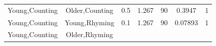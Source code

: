\documentclass[]{article}
\theoremstyle{definition}
\theoremstyle{definition}
\theoremstyle{definition}
\theoremstyle{remark}
\begin{document}
\begin{longtable}[]{@{}ccccccc@{}}
\begin{minipage}[t]{0.16\columnwidth}
Young,Counting\strut
\end{minipage} & \begin{minipage}[t]{0.16\columnwidth}\centering\strut
Older,Counting\strut
\end{minipage} & \begin{minipage}[t]{0.10\columnwidth}\centering\strut
0.5\strut
\end{minipage} & \begin{minipage}[t]{0.11\columnwidth}\centering\strut
1.267\strut
\end{minipage} & \begin{minipage}[t]{0.05\columnwidth}\centering\strut
90\strut
\end{minipage} & \begin{minipage}[t]{0.11\columnwidth}\centering\strut
0.3947\strut
\end{minipage} & \begin{minipage}[t]{0.11\columnwidth}\centering\strut
1\strut
\end{minipage}\tabularnewline
\begin{minipage}[t]{0.16\columnwidth}\centering\strut
Young,Counting\strut
\end{minipage} & \begin{minipage}[t]{0.16\columnwidth}\centering\strut
Young,Rhyming\strut
\end{minipage} & \begin{minipage}[t]{0.10\columnwidth}\centering\strut
0.1\strut
\end{minipage} & \begin{minipage}[t]{0.11\columnwidth}\centering\strut
1.267\strut
\end{minipage} & \begin{minipage}[t]{0.05\columnwidth}\centering\strut
90\strut
\end{minipage} & \begin{minipage}[t]{0.11\columnwidth}\centering\strut
0.07893\strut
\end{minipage} & \begin{minipage}[t]{0.11\columnwidth}\centering\strut
1\strut
\end{minipage}\tabularnewline
\begin{minipage}[t]{0.16\columnwidth}\centering\strut
Young,Counting\strut
\end{minipage} & \begin{minipage}[t]{0.16\columnwidth}\centering\strut
Older,Rhyming\strut
\end{minipage} & \begin{minipage}[t]{0.10\columnwidth}\centering\strut

\end{minipage}
\end{longtable}
\end{document}
